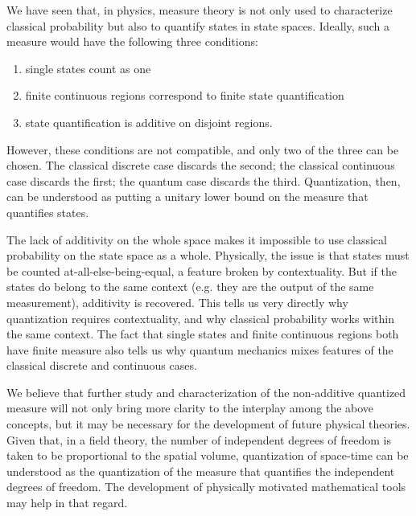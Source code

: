 \documentclass[10pt,twocolumn, nofootinbib]{revtex4-2}
\begin{document}
We have seen that, in physics, measure theory is not only used to characterize classical probability but also to quantify states in state spaces. Ideally, such a measure would have the following three conditions:
\begin{enumerate}
	\item single states count as one
	\item finite continuous regions correspond to finite state quantification
	\item state quantification is additive on disjoint regions.
\end{enumerate}
However, these conditions are not compatible, and only two of the three can be chosen. The classical discrete case discards the second; the classical continuous case discards the first; the quantum case discards the third. Quantization, then, can be understood as putting a unitary lower bound on the measure that quantifies states.

The lack of additivity on the whole space makes it impossible to use classical probability on the state space as a whole. Physically, the issue is that states must be counted at-all-else-being-equal, a feature broken by contextuality. But if the states do belong to the same context (e.g. they are the output of the same measurement), additivity is recovered. This tells us very directly why quantization requires contextuality, and why classical probability works within the same context. The fact that single states and finite continuous regions both have finite measure also tells us why quantum mechanics mixes features of the classical discrete and continuous cases.

We believe that further study and characterization of the non-additive quantized measure will not only bring more clarity to the interplay among the above concepts, but it may be necessary for the development of future physical theories. Given that, in a field theory, the number of independent degrees of freedom is taken to be proportional to the spatial volume, quantization of space-time can be understood as the quantization of the measure that quantifies the independent degrees of freedom. The development of physically motivated mathematical tools may help in that regard.



\newcommand{\pj}[1] {\underbar{$#1$}}
\end{document}
